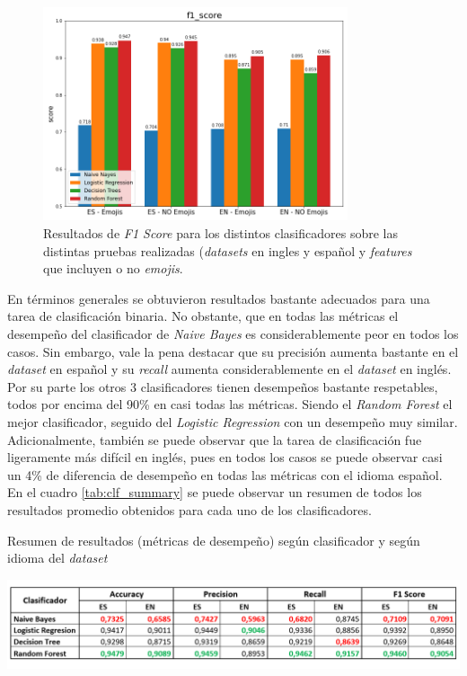 \begin{figure}[H]
    \centering
    \includegraphics[width=0.8\textwidth]{results/mourning_tweets_f1_score.png}
    \caption{Resultados de \textit{F1 Score} para los distintos clasificadores sobre las distintas pruebas realizadas (\textit{datasets} en ingles y español y \textit{features} que incluyen o no \textit{emojis}.}
    \label{fig:mt_f1score}
\end{figure}

En términos generales se obtuvieron resultados bastante adecuados para una tarea de clasificación binaria. No obstante, que en todas las métricas el desempeño del clasificador de \textit{Naive Bayes} es considerablemente peor en todos los casos. Sin embargo, vale la pena destacar que su precisión aumenta bastante en el \textit{dataset} en español y su \textit{recall} aumenta considerablemente en el \textit{dataset} en inglés. \\

Por su parte los otros 3 clasificadores tienen desempeños bastante respetables, todos por encima del 90\% en casi todas las métricas. Siendo el \textit{Random Forest} el mejor clasificador, seguido del \textit{Logistic Regression} con un desempeño muy similar. Adicionalmente, también se puede observar que la tarea de clasificación fue ligeramente más difícil en inglés, pues en todos los casos se puede observar casi un 4\% de diferencia de desempeño en todas las métricas con el idioma español. En el cuadro \ref{tab:clf_summary} se puede observar un resumen de todos los resultados promedio obtenidos para cada uno de los clasificadores.


\begin{table}[H]
    \centering
    \caption{Resumen de resultados (métricas de desempeño) según clasificador y según idioma del \textit{dataset}}
    \label{tab:clf_summary}
    \includegraphics[width=\textwidth]{doc/images/summary_results_clf.png}
\end{table}

